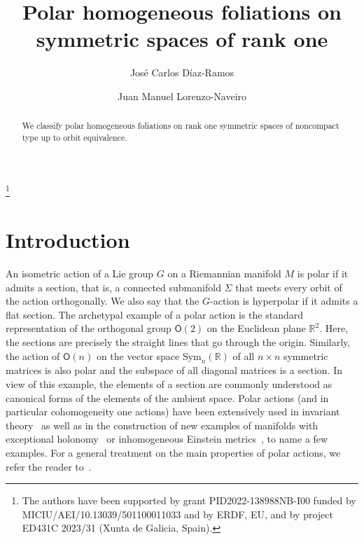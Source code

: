 \documentclass[12pt, a4paper]{amsart}
\newcommand{\s}{\mathsf}
\theoremstyle{definition}
\begin{document}
\title{Polar homogeneous foliations on symmetric spaces of rank one}
\author[J.~C.~D\'iaz-Ramos]{Jos\'e Carlos D\'iaz-Ramos}
\address{CITMAGA, Universidade de Santiago de Compostela, Spain}

\author[J.~M.~Lorenzo-Naveiro]{Juan Manuel Lorenzo-Naveiro}
\address{Department of Mathematics, University of Oklahoma, USA}

\begin{abstract}
We classify polar homogeneous foliations on rank one symmetric spaces of noncompact type up to orbit equivalence.
\end{abstract}



\thanks{The authors have been supported by 
	grant PID2022-138988NB-I00 funded by MICIU/AEI/10.13039/501100011033 and by ERDF, EU, 
	and by project ED431C 2023/31 (Xunta de Galicia, Spain).}

\maketitle

\section{Introduction}

An isometric action of a Lie group $G$ on a Riemannian manifold $M$ is polar if it admits a section,
that is, a connected submanifold $\Sigma$ that meets every orbit of the action orthogonally.
We also say that the $G$-action is hyperpolar if it admits a flat section.
The archetypal example of a polar action is the standard representation of the orthogonal group
$\s{O}(2)$ on the Euclidean plane $\mathbb{R}^2$.
Here, the sections are precisely the straight lines that go through the origin.
Similarly, the action of $\s{O}(n)$ on the vector space $\mathrm{Sym}_{n}(\mathbb{R})$
of all $n\times n$ symmetric matrices is also polar and
the subspace of all diagonal matrices is a section.
In view of this example, the elements of a section are commonly understood as canonical forms
of the elements of the ambient space.
Polar actions (and in particular cohomogeneity one actions) have been extensively used
in invariant theory~\cite{PalaisTerng87} as well as in the construction of new examples
of manifolds with exceptional holonomy~\cite{Bryant97} or inhomogeneous Einstein
metrics~\cite{Bohm98}, to name a few examples.
For a general treatment on the main properties of polar actions, we refer the reader
to~\cite{GroveZiller,PalaisTerng87}.
\end{document}
